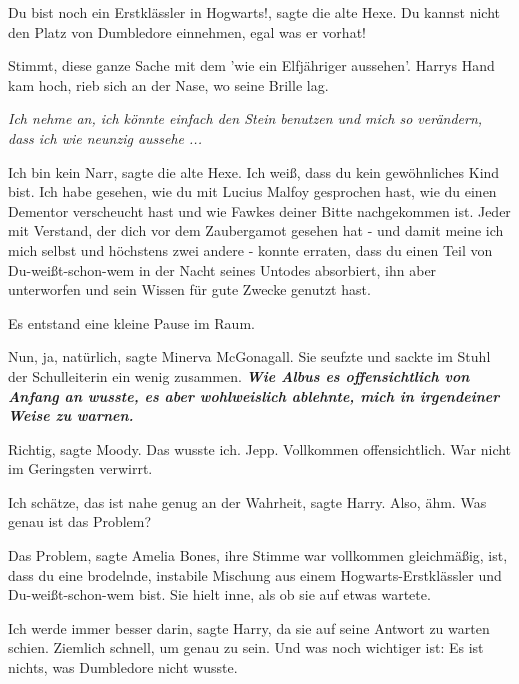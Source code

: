 \glqq{}Du bist noch ein Erstklässler in Hogwarts!\grqq{}, sagte die alte Hexe.
\glqq{}Du kannst nicht den Platz von Dumbledore einnehmen, egal was er vorhat!\grqq{}

\glqq{}Stimmt, diese ganze Sache mit dem 'wie ein Elfjähriger aussehen'.\grqq{} Harrys
Hand kam hoch, rieb sich an der Nase, wo seine Brille lag.

\emph{Ich nehme an, ich könnte einfach den Stein benutzen und mich so verändern,
dass ich wie neunzig aussehe ...}

\glqq{}Ich bin kein Narr\grqq{}, sagte die alte Hexe. \glqq{}Ich weiß, dass du
kein gewöhnliches Kind bist. Ich habe gesehen, wie du mit Lucius Malfoy
gesprochen hast, wie du einen Dementor verscheucht hast und wie Fawkes deiner
Bitte nachgekommen ist. Jeder mit Verstand, der dich vor dem Zaubergamot gesehen
hat - und damit meine ich mich selbst und höchstens zwei andere - konnte
erraten, dass du einen Teil von Du-weißt-schon-wem in der Nacht seines Untodes
absorbiert, ihn aber unterworfen und sein Wissen für gute Zwecke genutzt hast.\grqq{}

Es entstand eine kleine Pause im Raum.

\glqq{}Nun, ja, natürlich\grqq{}, sagte Minerva McGonagall. Sie seufzte und
sackte im Stuhl der Schulleiterin ein wenig zusammen. \glqq{}\textbf{\emph{Wie
Albus es offensichtlich von Anfang an wusste, es aber wohlweislich ablehnte,
mich in irgendeiner Weise zu warnen.}}\grqq{}

\glqq{}Richtig\grqq{}, sagte Moody. \glqq{}Das wusste ich. Jepp. Vollkommen
offensichtlich. War nicht im Geringsten verwirrt.\grqq{}

\glqq{}Ich schätze, das ist nahe genug an der Wahrheit\grqq{}, sagte Harry. \glqq{}
Also, ähm. Was genau ist das Problem?\grqq{}

\glqq{}Das Problem\grqq{}, sagte Amelia Bones, ihre Stimme war vollkommen
gleichmäßig, \glqq{}ist, dass du eine brodelnde, instabile Mischung aus einem
Hogwarts-Erstklässler und Du-weißt-schon-wem bist.\grqq{} Sie hielt inne, als ob sie
auf etwas wartete.

\glqq{}Ich werde immer besser darin\grqq{}, sagte Harry, da sie auf seine Antwort
zu warten schien. \glqq{}Ziemlich schnell, um genau zu sein. Und was noch
wichtiger ist: Es ist nichts, was Dumbledore nicht wusste.\grqq{}

